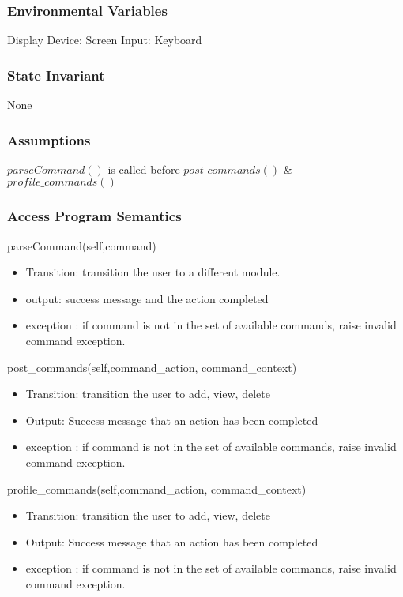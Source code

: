 \documentclass[12pt, titlepage]{article}
\begin{document}
\subsubsection{Environmental Variables}
 Display Device: Screen
 Input: Keyboard

\subsubsection{State Invariant}
None

\subsubsection{Assumptions}
$parseCommand()$ is called before $post\_commands()$ \& $profile\_commands()$

\subsubsection{Access Program Semantics}
 parseCommand(self,command)
\begin{itemize}
    \item Transition: transition the user to a different module.
    \item output: success message and the action completed
    \item exception : if command is not in the set of available commands, raise invalid command exception.
\end{itemize}

post\_commands(self,command\_action, command\_context)
\begin{itemize}
    \item Transition: transition the user to add, view, delete
    \item Output: Success message that an action has been completed
    \item exception : if command is not in the set of available commands, raise invalid command exception.
\end{itemize}

profile\_commands(self,command\_action, command\_context)
\begin{itemize}
    \item Transition: transition the user to add, view, delete
    \item Output: Success message that an action has been completed
    \item exception : if command is not in the set of available commands, raise invalid command exception.
\end{itemize}
\end{document}
